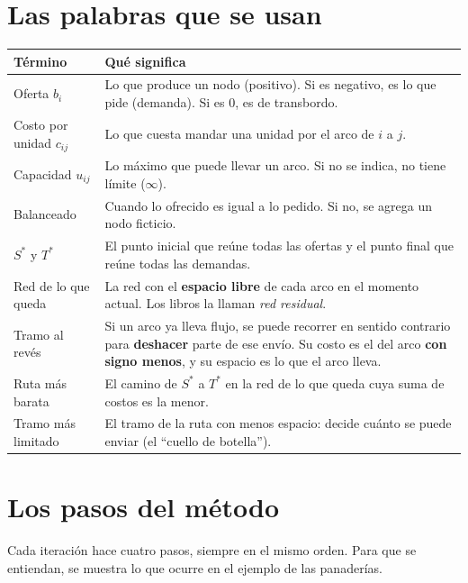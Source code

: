 \documentclass[11pt,a4paper]{article}
\newcommand{\Sini}{\ensuremath{S^{*}}}
\newcommand{\Tfin}{\ensuremath{T^{*}}}
\begin{document}
\section{Las palabras que se usan}

\begin{center}\small
\begin{tabular}{p{3.6cm}p{10.6cm}}
\toprule
\textbf{Término} & \textbf{Qué significa} \\
\midrule
Oferta $b_i$ & Lo que produce un nodo (positivo). Si es negativo, es lo que pide (demanda). Si es 0, es de transbordo. \\
Costo por unidad $c_{ij}$ & Lo que cuesta mandar una unidad por el arco de $i$ a $j$. \\
Capacidad $u_{ij}$ & Lo máximo que puede llevar un arco. Si no se indica, no tiene límite ($\infty$). \\
Balanceado & Cuando lo ofrecido es igual a lo pedido. Si no, se agrega un nodo ficticio. \\
\Sini{} y \Tfin & El punto inicial que reúne todas las ofertas y el punto final que reúne todas las demandas. \\
Red de lo que queda & La red con el \textbf{espacio libre} de cada arco en el momento actual. Los libros la llaman
                      \emph{red residual}. \\
Tramo al revés & Si un arco ya lleva flujo, se puede recorrer en sentido contrario para \textbf{deshacer} parte de ese
                 envío. Su costo es el del arco \textbf{con signo menos}, y su espacio es lo que el arco lleva. \\
Ruta más barata & El camino de \Sini{} a \Tfin{} en la red de lo que queda cuya suma de costos es la menor. \\
Tramo más limitado & El tramo de la ruta con menos espacio: decide cuánto se puede enviar (el ``cuello de botella''). \\
\bottomrule
\end{tabular}
\end{center}

\section{Los pasos del método}\label{sec:algoritmo}

Cada iteración hace cuatro pasos, siempre en el mismo orden. Para que se entiendan, se muestra lo que
ocurre en el ejemplo de las panaderías.
\end{document}
